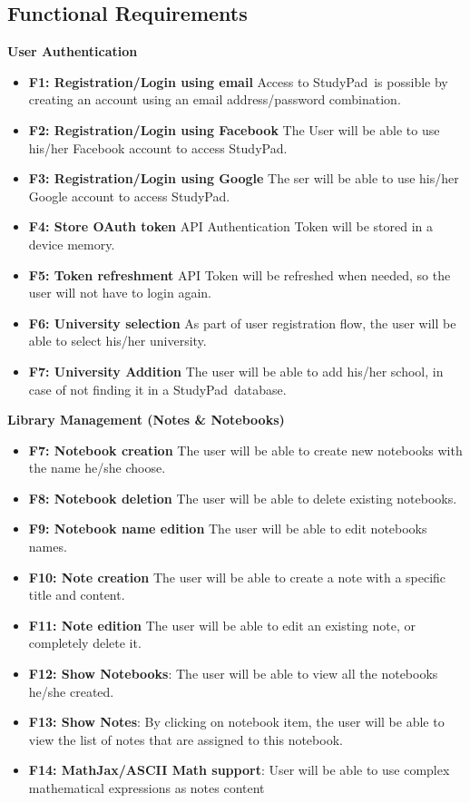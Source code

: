 \documentclass[thesis=B,english]{FITthesis}[2012/10/20]
\newcommand{\appname}{StudyPad}
\begin{document}
\subsection{Functional Requirements}
\bigskip
\textbf{User Authentication}
\begin{itemize}
	\item \textbf{F1: Registration/Login using email} Access to \appname\ is possible by creating an account using an email address/password combination.
	\item \textbf{F2: Registration/Login using Facebook} The User will be able to use his/her Facebook account to access \appname.
	\item \textbf{F3: Registration/Login using Google} The ser will be able to use his/her Google account to access \appname.
	\item \textbf{F4: Store OAuth token} API Authentication Token will be stored in a device memory.
	\item \textbf{F5: Token refreshment} API Token will be refreshed when needed, so the user will not have to login again.
	\item \textbf{F6: University selection} As part of user registration flow, the user will be able to select his/her university.
	\item \textbf{F7: University Addition} The user will be able to add his/her school, in case of not finding it in a \appname\ database.
\end{itemize}
\bigskip
\textbf{Library Management (Notes \& Notebooks)}
\begin{itemize}
	\item \textbf{F7: Notebook creation} The user will be able to create new notebooks with the name he/she choose.
	\item \textbf{F8: Notebook deletion} The user will be able to delete existing notebooks.
	\item \textbf{F9: Notebook name edition} The user will be able to edit notebooks names.
	\item \textbf{F10: Note creation} The user will be able to create a note with a specific title and content.
	\item \textbf{F11: Note edition} The user will be able to edit an existing note, or completely delete it.
	\item \textbf{F12: Show Notebooks}: The user will be able to view all the notebooks he/she created.
	\item \textbf{F13: Show Notes}: By clicking on notebook item, the user will be able to view the list of notes that are assigned to this notebook.
	\item \textbf{F14: MathJax/ASCII Math support}: User will be able to use complex mathematical expressions as notes content
\end{itemize}
\end{document}
